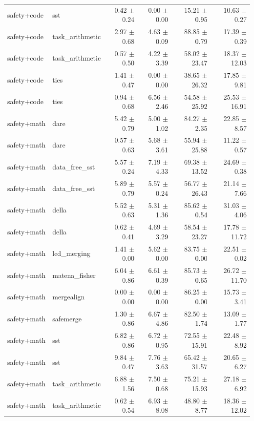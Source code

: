 \begin{table}[H]
{\begin{tabular}{llrrrr}
safety+code & sst & 0.42 $\pm$ 0.24 & 0.00 $\pm$ 0.00 & 15.21 $\pm$ 0.95 & 10.63 $\pm$ 0.27 \\
safety+code & task\_arithmetic & 2.97 $\pm$ 0.68 & 4.63 $\pm$ 0.09 & 88.85 $\pm$ 0.79 & 17.39 $\pm$ 0.39 \\
safety+code & task\_arithmetic & 0.57 $\pm$ 0.50 & 4.22 $\pm$ 3.39 & 58.02 $\pm$ 23.47 & 18.37 $\pm$ 12.03 \\
safety+code & ties & 1.41 $\pm$ 0.47 & 0.00 $\pm$ 0.00 & 38.65 $\pm$ 26.32 & 17.85 $\pm$ 9.81 \\
safety+code & ties & 0.94 $\pm$ 0.68 & 6.56 $\pm$ 2.46 & 54.58 $\pm$ 25.92 & 25.53 $\pm$ 16.91 \\
safety+math & dare & 5.42 $\pm$ 0.79 & 5.00 $\pm$ 1.02 & 84.27 $\pm$ 2.35 & 22.85 $\pm$ 8.57 \\
safety+math & dare & 0.57 $\pm$ 0.63 & 5.68 $\pm$ 3.61 & 55.94 $\pm$ 25.88 & 11.22 $\pm$ 0.57 \\
safety+math & data\_free\_sst & 5.57 $\pm$ 0.24 & 7.19 $\pm$ 4.33 & 69.38 $\pm$ 13.52 & 24.69 $\pm$ 0.38 \\
safety+math & data\_free\_sst & 5.89 $\pm$ 0.79 & 5.57 $\pm$ 0.24 & 56.77 $\pm$ 26.43 & 21.14 $\pm$ 7.66 \\
safety+math & della & 5.52 $\pm$ 0.63 & 5.31 $\pm$ 1.36 & 85.62 $\pm$ 0.54 & 31.03 $\pm$ 4.06 \\
safety+math & della & 0.62 $\pm$ 0.41 & 4.69 $\pm$ 3.29 & 58.54 $\pm$ 23.27 & 17.78 $\pm$ 11.72 \\
safety+math & led\_merging & 1.41 $\pm$ 0.00 & 5.62 $\pm$ 0.00 & 83.75 $\pm$ 0.00 & 22.51 $\pm$ 0.02 \\
safety+math & matena\_fisher & 6.04 $\pm$ 0.86 & 6.61 $\pm$ 0.39 & 85.73 $\pm$ 0.65 & 26.72 $\pm$ 11.70 \\
safety+math & mergealign & 0.00 $\pm$ 0.00 & 0.00 $\pm$ 0.00 & 86.25 $\pm$ 0.00 & 15.73 $\pm$ 3.41 \\
safety+math & safemerge & 1.30 $\pm$ 0.86 & 6.67 $\pm$ 4.86 & 82.50 $\pm$ 1.74 & 13.09 $\pm$ 1.77 \\
safety+math & sst & 6.82 $\pm$ 0.86 & 6.72 $\pm$ 0.95 & 72.55 $\pm$ 15.91 & 22.48 $\pm$ 8.92 \\
safety+math & sst & 9.84 $\pm$ 0.47 & 7.76 $\pm$ 3.63 & 65.42 $\pm$ 31.57 & 20.65 $\pm$ 6.27 \\
safety+math & task\_arithmetic & 6.88 $\pm$ 1.56 & 7.50 $\pm$ 0.68 & 75.21 $\pm$ 15.93 & 27.18 $\pm$ 6.92 \\
safety+math & task\_arithmetic & 0.62 $\pm$ 0.54 & 6.93 $\pm$ 8.08 & 48.80 $\pm$ 8.77 & 18.36 $\pm$ 12.02 \\

\end{tabular}}
\end{table}
